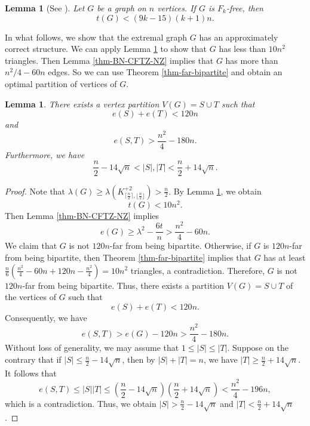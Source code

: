 \documentclass[11pt]{article}
\newtheorem{lemma}[theorem]{Lemma}
\begin{document}
\begin{lemma}[See \cite{AS2016}] \label{lem-AS}
Let $G$ be a graph on $n$ vertices.  
If $G$ is $F_k$-free, then 
\[ t(G)< (9k-15)(k+1)n. \]  
\end{lemma}




In what follows, we show that 
the extremal graph $G$ has an approximately correct structure. 
We can apply Lemma \ref{lem-AS} to 
show that $G$ has less than $10n^2$ 
triangles. 
Then Lemma \ref{thm-BN-CFTZ-NZ} implies 
that $G$ has more than $n^2/4 - 60n$ edges. 
So we can use Theorem \ref{thm-far-bipartite} and obtain an optimal partition of vertices of $G$. 



\begin{lemma}\label{lem-partition}
There exists a vertex partition  $V(G)=S\cup T$ such that 
$$ e(S) + e(T) < 120n $$
and 
$$e(S, T)> \frac{n^2}{4} - 180n. $$
Furthermore, we have 
\[
\frac{n}{2} - 14\sqrt{n} < |S|, |T| < 
\frac{n}{2} + 14\sqrt{n}.
\]
\end{lemma}


\begin{proof}
Note that $\lambda (G)\ge  \lambda (K_{\lceil \frac{n}{2} \rceil, \lfloor \frac{n}{2} \rfloor}^{+2}) > \frac{n}{2}$.  
By Lemma \ref{lem-AS}, we obtain 
\[  t(G)< 10n^2. \]
Then Lemma \ref{thm-BN-CFTZ-NZ} implies 
\[  e(G) \ge \lambda^2 - \frac{6t}{n} 
> \frac{n^2}{4} - 60n.  \]
We claim that $G$ is not $120n$-far from being bipartite.  
Otherwise, if $G$ is $120n$-far from being bipartite, then Theorem \ref{thm-far-bipartite} 
implies that $G$ has at least $\frac{n}{6}(\frac{n^2}{4} - 60n 
+ 120n - \frac{n^2}{4}) = 10n^2$ triangles, a contradiction. 
Therefore, $G$ is not $120n$-far from being bipartite. 
Thus, there exists a partition $V(G)=S\cup T$ of 
the vertices of $G$ such that    
\begin{equation*}  \label{eq-EST}
e(S) + e(T) < 120n. 
\end{equation*}
 Consequently, we have 
\[ e(S,T)> e(G) - 120n  
> \frac{n^2}{4} - 180n. \] 
Without loss of generality, we may assume that 
$1\le |S| \le |T|$. Suppose on the contrary that 
if $|S| \le \frac{n}{2} - 14\sqrt{n}$, then by $|S| + |T|=n$, we have 
$|T| \ge \frac{n}{2}  + 14\sqrt{n}$. It follows that 
\[ e(S,T)\le |S| |T| \le 
\left(\frac{n}{2} - 14\sqrt{n} \right)
\left(\frac{n}{2} + 14\sqrt{n} \right) 
< \frac{n^2}{4} - 196n, \] 
which is a contradiction. Thus, we obtain $|S| > 
\frac{n}{2} - 14\sqrt{n}$ and 
$|T| < \frac{n}{2} + 14\sqrt{n}$. 
        \end{proof}
        
\end{document}
